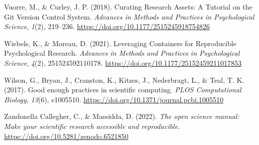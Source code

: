 \documentclass[
  a4paper,
]{book}
\newlength{\cslhangindent}
\newenvironment{CSLReferences}[2] %
 {\begin{list}{}{%
  \setlength{\itemindent}{0pt}
  \setlength{\leftmargin}{0pt}
  \setlength{\parsep}{0pt}
  \ifodd #1
   \setlength{\leftmargin}{\cslhangindent}
   \setlength{\itemindent}{-1\cslhangindent}
  \fi
  \setlength{\itemsep}{#2\baselineskip}}}
 {\end{list}}
\begin{document}
\begin{CSLReferences}{1}{0}
Vuorre, M., \& Curley, J. P. (2018). Curating {Research Assets}: {A
Tutorial} on the {Git Version Control System}. \emph{Advances in Methods
and Practices in Psychological Science}, \emph{1}(2), 219--236.
\url{https://doi.org/10.1177/2515245918754826}

Wiebels, K., \& Moreau, D. (2021). Leveraging {Containers} for
{Reproducible Psychological Research}. \emph{Advances in Methods and
Practices in Psychological Science}, \emph{4}(2), 251524592110178.
\url{https://doi.org/10.1177/25152459211017853}

Wilson, G., Bryan, J., Cranston, K., Kitzes, J., Nederbragt, L., \&
Teal, T. K. (2017). Good enough practices in scientific computing.
\emph{PLOS Computational Biology}, \emph{13}(6), e1005510.
\url{https://doi.org/10.1371/journal.pcbi.1005510}

Zandonella Callegher, C., \& Massidda, D. (2022). \emph{The open science
manual: Make your scientific research accessible and reproducible}.
\url{https://doi.org/10.5281/zenodo.6521850}

\end{CSLReferences}


\backmatter

\printindex

\end{document}
